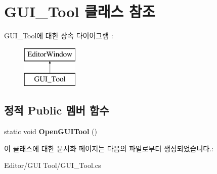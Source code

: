 \hypertarget{class_g_u_i___tool}{}\section{G\+U\+I\+\_\+\+Tool 클래스 참조}
\label{class_g_u_i___tool}
G\+U\+I\+\_\+\+Tool에 대한 상속 다이어그램 \+: \begin{figure}[H]
\begin{center}
\leavevmode
\includegraphics[height=2.000000cm]{class_g_u_i___tool}
\end{center}
\end{figure}
\subsection*{정적 Public 멤버 함수}
\begin{DoxyCompactItemize}
\item 
\hypertarget{class_g_u_i___tool_a6b3f8c41cf3e71267a13fef94ecb7fb8}{}static void {\bfseries Open\+G\+U\+I\+Tool} ()\label{class_g_u_i___tool_a6b3f8c41cf3e71267a13fef94ecb7fb8}

\end{DoxyCompactItemize}


이 클래스에 대한 문서화 페이지는 다음의 파일로부터 생성되었습니다.\+:\begin{DoxyCompactItemize}
\item 
Editor/\+G\+U\+I Tool/G\+U\+I\+\_\+\+Tool.\+cs\end{DoxyCompactItemize}
